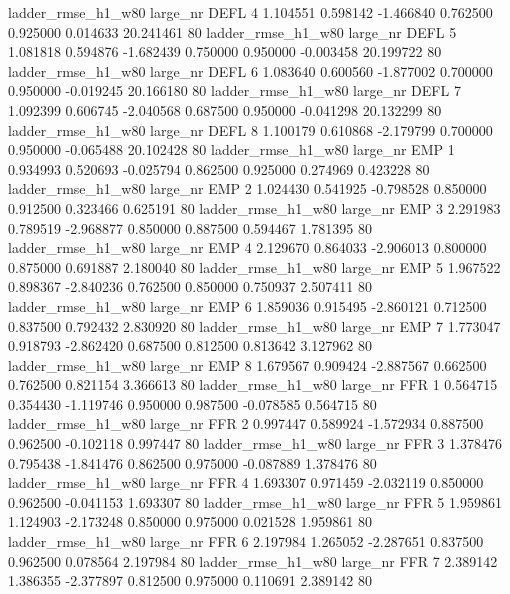  ladder_rmse_h1_w80   large_nr     DEFL                 4  1.104551  0.598142  -1.466840 0.762500 0.925000  0.014633   20.241461 80
 ladder_rmse_h1_w80   large_nr     DEFL                 5  1.081818  0.594876  -1.682439 0.750000 0.950000 -0.003458   20.199722 80
 ladder_rmse_h1_w80   large_nr     DEFL                 6  1.083640  0.600560  -1.877002 0.700000 0.950000 -0.019245   20.166180 80
 ladder_rmse_h1_w80   large_nr     DEFL                 7  1.092399  0.606745  -2.040568 0.687500 0.950000 -0.041298   20.132299 80
 ladder_rmse_h1_w80   large_nr     DEFL                 8  1.100179  0.610868  -2.179799 0.700000 0.950000 -0.065488   20.102428 80
 ladder_rmse_h1_w80   large_nr      EMP                 1  0.934993  0.520693  -0.025794 0.862500 0.925000  0.274969    0.423228 80
 ladder_rmse_h1_w80   large_nr      EMP                 2  1.024430  0.541925  -0.798528 0.850000 0.912500  0.323466    0.625191 80
 ladder_rmse_h1_w80   large_nr      EMP                 3  2.291983  0.789519  -2.968877 0.850000 0.887500  0.594467    1.781395 80
 ladder_rmse_h1_w80   large_nr      EMP                 4  2.129670  0.864033  -2.906013 0.800000 0.875000  0.691887    2.180040 80
 ladder_rmse_h1_w80   large_nr      EMP                 5  1.967522  0.898367  -2.840236 0.762500 0.850000  0.750937    2.507411 80
 ladder_rmse_h1_w80   large_nr      EMP                 6  1.859036  0.915495  -2.860121 0.712500 0.837500  0.792432    2.830920 80
 ladder_rmse_h1_w80   large_nr      EMP                 7  1.773047  0.918793  -2.862420 0.687500 0.812500  0.813642    3.127962 80
 ladder_rmse_h1_w80   large_nr      EMP                 8  1.679567  0.909424  -2.887567 0.662500 0.762500  0.821154    3.366613 80
 ladder_rmse_h1_w80   large_nr      FFR                 1  0.564715  0.354430  -1.119746 0.950000 0.987500 -0.078585    0.564715 80
 ladder_rmse_h1_w80   large_nr      FFR                 2  0.997447  0.589924  -1.572934 0.887500 0.962500 -0.102118    0.997447 80
 ladder_rmse_h1_w80   large_nr      FFR                 3  1.378476  0.795438  -1.841476 0.862500 0.975000 -0.087889    1.378476 80
 ladder_rmse_h1_w80   large_nr      FFR                 4  1.693307  0.971459  -2.032119 0.850000 0.962500 -0.041153    1.693307 80
 ladder_rmse_h1_w80   large_nr      FFR                 5  1.959861  1.124903  -2.173248 0.850000 0.975000  0.021528    1.959861 80
 ladder_rmse_h1_w80   large_nr      FFR                 6  2.197984  1.265052  -2.287651 0.837500 0.962500  0.078564    2.197984 80
 ladder_rmse_h1_w80   large_nr      FFR                 7  2.389142  1.386355  -2.377897 0.812500 0.975000  0.110691    2.389142 80
